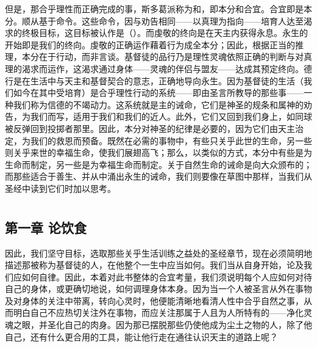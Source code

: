 但是，那合乎理性而正确完成的事，斯多葛派称为和，即本分和合宜。合宜即是本分。顺从基于命令。这些命令，因与劝告相同——以真理为指向——培育人达至渴求的终极目标，这目标被认作是（）。而虔敬的终向是在天主内获得永息。永生的开始即是我们的终向。虔敬的正确运作藉着行为成全本分；因此，根据正当的推理，本分在于行动，而非言谈。基督徒的品行乃是理性灵魂依照正确的判断与对真理的渴求而运作，这渴求通过身体——灵魂的伴侣与盟友——达成其预定终向。德行是在生活中与天主和基督契合的意志，正确地导向永生。因为基督徒的生活（我们如今在其中受培育）是合乎理性行动的系统——即由圣言所教导的那些事——一种我们称为信德的不竭动力。这系统就是主的诫命，它们是神圣的规条和属神的劝告，为我们而写，适用于我们和我们的近人。此外，它们又回到我们身上，如同球被反弹回到投掷者那里。因此，本分对神圣的纪律是必要的，因为它们由天主治定，为我们的救恩而预备。既然在必需的事物中，有些只关乎此世的生命，另一些则关乎来世的幸福生命，使我们展翅高飞；那么，以类似的方式，本分中有些是为生命而制定，另一些是为幸福生命而制定。关于自然生命的诫命是向大众颁布的；而那些适合于善生、并从中涌出永生的诫命，我们则要像在草图中那样，当我们从圣经中读到它们时加以思考。\par



\section{}


\subsection{第一章  论饮食}

因此，我们坚守目标，选取那些关乎生活训练之益处的圣经章节，现在必须简明地描述那被称为基督徒的人，在他整个一生中应当如何。我们当从自身开始，论及我们应如何自律。因此，本着对此书整体的合宜考量，我们须说明每个人应如何对待自己的身体，或更确切地说，如何调理身体本身。因为当一个人被圣言从外在事物及对身体的关注中带离，转向心灵时，他便能清晰地看清人性中合乎自然之事，从而明白自己不应热切关注外在事物，而应关注那属于人且为人所特有的——净化灵魂之眼，并圣化自己的肉身。因为那已摆脱那些仍使他成为尘土之物的人，除了他自己，还有什么更合用的工具，能让他行走在通往认识天主的道路上呢？\par

